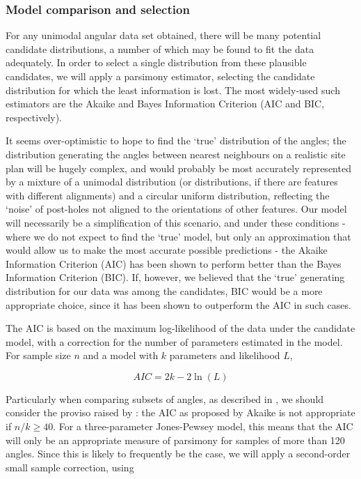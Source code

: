 \documentclass[../../ArchStats.tex]{subfiles}
\begin{document}
\subsubsection{Model comparison and selection}

For any unimodal angular data set obtained, there will be many potential candidate distributions, a number of which may be found to fit the data adequately. In order to select a single distribution from these plausible candidates, we will apply a parsimony estimator, selecting the candidate distribution for which the least information is lost. The most widely-used such estimators are the Akaike and Bayes Information Criterion (AIC and BIC, respectively).

It seems over-optimistic to hope to find the `true' distribution of the angles; the distribution generating the angles between nearest neighbours on a realistic site plan will be hugely complex, and would probably be most accurately represented by a mixture of a unimodal distribution (or distributions, if there are features with different alignments) and a circular uniform distribution, reflecting the `noise'  of post-holes not aligned to the orientations of other features. Our model will necessarily be a simplification of this scenario, and under these conditions - where we do not expect to find the `true' model, but only an approximation that would allow us to make the most accurate possible predictions - the Akaike Information Criterion (AIC) has been shown to perform better than the Bayes Information Criterion (BIC)\cite{aho2014}. If, however, we believed that the `true' generating distribution for our data was among the candidates, BIC would be a more appropriate choice, since it has been shown to outperform the AIC in such cases. 

The AIC is based on the maximum log-likelihood of the data under the candidate model, with a correction for the number of parameters estimated in the model\cite{Akaike1974}. For sample size $n$ and a model with $k$ parameters and likelihood $L$, 

\[AIC = 2k - 2 \ln (L)\]

Particularly when comparing subsets of angles, as described in , we should consider the proviso raised by \cite{Burnham2004}: the AIC as proposed by Akaike  is not appropriate if $n/k \geq 40$. For a three-parameter Jones-Pewsey model, this means that the AIC will only be an appropriate measure of parsimony for samples of more than 120 angles. Since this is likely to frequently be the case, we will apply a second-order small sample correction, using
\end{document}
